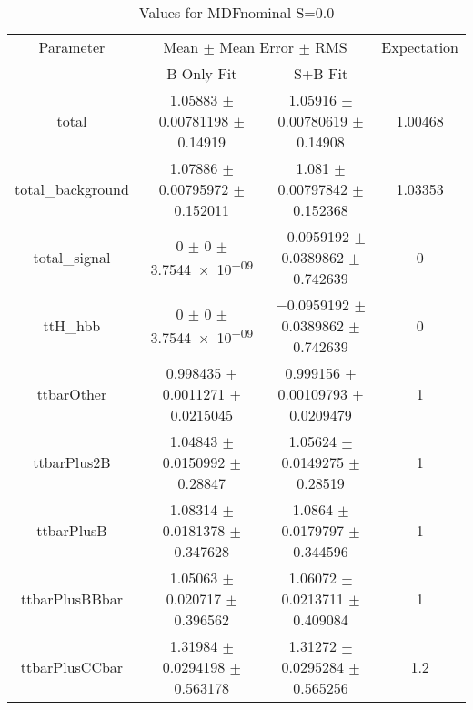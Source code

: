 \begin{table}
\centering
\caption{Values for MDFnominal S=0.0}
\begin{tabular}{cccc}
\toprule
Parameter & \multicolumn{2}{c}{Mean $\pm$ Mean Error $\pm$ RMS} & Expectation\\
 & B-Only Fit & S+B Fit & \\
\midrule
total & \num{1.05883} $\pm$ \num{0.00781198} $\pm$ \num{0.14919} & \num{1.05916} $\pm$ \num{0.00780619} $\pm$ \num{0.14908} & \num{1.00468}\\
total\_background & \num{1.07886} $\pm$ \num{0.00795972} $\pm$ \num{0.152011} & \num{1.081} $\pm$ \num{0.00797842} $\pm$ \num{0.152368} & \num{1.03353}\\
total\_signal & \num{0} $\pm$ \num{0} $\pm$ \num{3.7544e-09} & \num{-0.0959192} $\pm$ \num{0.0389862} $\pm$ \num{0.742639} & \num{0}\\
ttH\_hbb & \num{0} $\pm$ \num{0} $\pm$ \num{3.7544e-09} & \num{-0.0959192} $\pm$ \num{0.0389862} $\pm$ \num{0.742639} & \num{0}\\
ttbarOther & \num{0.998435} $\pm$ \num{0.0011271} $\pm$ \num{0.0215045} & \num{0.999156} $\pm$ \num{0.00109793} $\pm$ \num{0.0209479} & \num{1}\\
ttbarPlus2B & \num{1.04843} $\pm$ \num{0.0150992} $\pm$ \num{0.28847} & \num{1.05624} $\pm$ \num{0.0149275} $\pm$ \num{0.28519} & \num{1}\\
ttbarPlusB & \num{1.08314} $\pm$ \num{0.0181378} $\pm$ \num{0.347628} & \num{1.0864} $\pm$ \num{0.0179797} $\pm$ \num{0.344596} & \num{1}\\
ttbarPlusBBbar & \num{1.05063} $\pm$ \num{0.020717} $\pm$ \num{0.396562} & \num{1.06072} $\pm$ \num{0.0213711} $\pm$ \num{0.409084} & \num{1}\\
ttbarPlusCCbar & \num{1.31984} $\pm$ \num{0.0294198} $\pm$ \num{0.563178} & \num{1.31272} $\pm$ \num{0.0295284} $\pm$ \num{0.565256} & \num{1.2}\\
\bottomrule
\end{tabular}
\end{table}